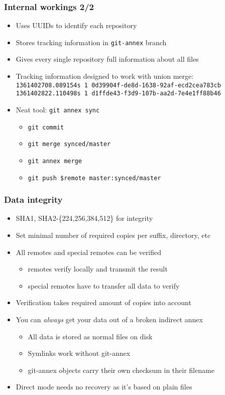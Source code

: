 \documentclass[t]{beamer}
\begin{document}
\begin{frame}
	\frametitle{Internal workings 2/2}
	\begin{itemize}
		\item Uses UUIDs to identify each repository
		\item Stores tracking information in \texttt{git-annex} branch
		\item Gives every single repository full information about all files
		\item Tracking information designed to work with union merge: \\
			{\footnotesize \texttt{1361402708.089154s 1 0d39904f-de8d-1638-92af-ecd2cea783cb}} \\
			{\footnotesize \texttt{1361402822.110498s 1 d1ffde43-f3d9-107b-aa2d-7e4e1ff88b46}}
		\item Neat tool: \texttt{git annex sync}
		\begin{itemize}
			\item \texttt{git commit}
			\item \texttt{git merge synced/master}
			\item \texttt{git annex merge}
			\item \texttt{git push \$remote master:synced/master}
		\end{itemize}
	\end{itemize}
\end{frame}

\begin{frame}
	\frametitle{Data integrity}
	\begin{itemize}
		\item SHA1, SHA2-\{224,256,384,512\} for integrity
		\item Set minimal number of required copies per suffix, directory, etc
		\item All remotes and special remotes can be verified
		\begin{itemize}
			\item remotes verify locally and transmit the result
			\item special remotes have to transfer all data to verify
		\end{itemize}
		\item Verification takes required amount of copies into account
		\item You can \textit{always} get your data out of a broken indirect annex
		\begin{itemize}
			\item All data is stored as normal files on disk
			\item Symlinks work without git-annex
			\item git-annex objects carry their own checksum in their filename
		\end{itemize}
		\item Direct mode needs no recovery as it's based on plain files
	\end{itemize}
\end{frame}
\end{document}
